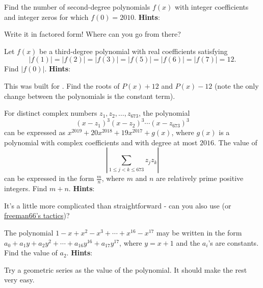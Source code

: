 \documentclass[11pt,titlepage]{scrartcl}
\newenvironment{hint}{\footnotesize \normalfont \textbf{Hints}:}{\hspace{-0.5ex}}
\begin{document}
\begin{problem}
Find the number of second-degree polynomials $f(x)$ with integer coefficients and integer zeros for which $f(0)=2010$.
\begin{hint}
\begin{addhint}{
Write it in factored form! Where can you go from there?
}\end{addhint}
\end{hint}
\end{problem}
\begin{problem}
Let $f(x)$ be a third-degree polynomial with real coefficients satisfying \[|f(1)|=|f(2)|=|f(3)|=|f(5)|=|f(6)|=|f(7)|=12.\] Find $|f(0)|$.
\begin{hint}
\begin{addhint}{
This was built for . Find the roots of $P(x)+12$ and $P(x)-12$ (note the only change between the polynomials is the constant term).
}\end{addhint}
\end{hint}
\end{problem}
\begin{problem}
For distinct complex numbers $z_1,z_2,\dots,z_{673}$, the polynomial \[(x-z_1)^3(x-z_2)^3 \cdots (x-z_{673})^3\]can be expressed as $x^{2019} + 20x^{2018} + 19x^{2017}+g(x)$, where $g(x)$ is a polynomial with complex coefficients and with degree at most $2016$. The value of \[\left| \sum_{1 \le j <k \le 673} z_jz_k \right|\]can be expressed in the form $\tfrac{m}{n}$, where $m$ and $n$ are relatively prime positive integers. Find $m+n$.
\begin{hint}
\begin{addhint}{
It's a little more complicated than straightforward  - can you also use  (or \hyperlink{freelist}{freeman66's tactics})?
}\end{addhint}
\end{hint}
\end{problem}
\begin{problem}
The polynomial $1-x+x^2-x^3+\cdots+x^{16}-x^{17}$ may be written in the form $a_0+a_1y+a_2y^2+\cdots +a_{16}y^{16}+a_{17}y^{17}$, where $y=x+1$ and the $a_i$'s are constants. Find the value of $a_2$.
\begin{hint}
\begin{addhint}{
Try a geometric series as the value of the polynomial. It should make the rest very easy.
}\end{addhint}
\end{hint}
\end{problem}
\end{document}
